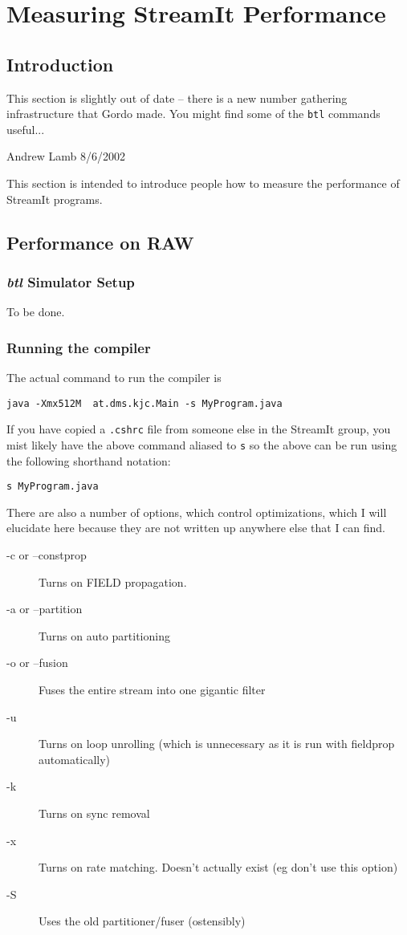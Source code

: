 \section{Measuring StreamIt Performance}
\subsection{Introduction}
{\huge This section is slightly out of date -- there is a 
new number gathering infrastructure that Gordo made. You 
might find some of the {\tt btl} commands useful...}

Andrew Lamb 8/6/2002

This section is intended to introduce people how to measure the performance
of StreamIt programs.


\subsection{Performance on RAW}
\subsubsection{\textit{btl} Simulator Setup}
To be done.

\subsubsection{Running the compiler}
The actual command to run the compiler is 
\begin{verbatim}java -Xmx512M  at.dms.kjc.Main -s MyProgram.java\end{verbatim}

If you have copied a \texttt{.cshrc} file from someone else in the
StreamIt group, you mist likely have the above command aliased to \texttt{s}
so the above can be run using the following shorthand notation:
\begin{verbatim}s MyProgram.java\end{verbatim}

There are also a number of options, which control optimizations,
which I will elucidate here because they are not written up anywhere
else that I can find.
\begin{description}
\item [-c or --constprop] Turns on FIELD propagation.
\item [-a or --partition] Turns on auto partitioning
\item [-o or --fusion] Fuses the entire stream into one gigantic filter
\item [-u] Turns on loop unrolling (which is unnecessary as it is run with fieldprop automatically)
\item [-k] Turns on sync removal
\item [-x] Turns on rate matching. Doesn't actually exist (eg don't use this option)
\item [-S] Uses the old partitioner/fuser (ostensibly)
\end{description}


